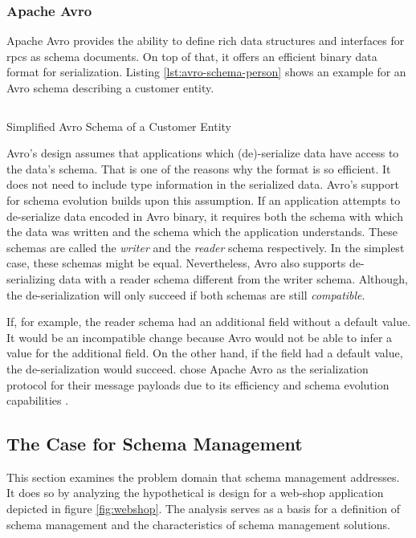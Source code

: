 \subsubsection{Apache Avro}

Apache Avro provides the ability to define rich data structures and interfaces for \glspl{rpc} as schema documents.
On top of that, it offers an efficient binary data format for serialization.
Listing \ref{lst:avro-schema-person} shows an example for an Avro schema describing a customer entity.
\parencite{apache_software_foundation_apache_2021}

\begin{listing}[H]
  \inputminted{json}{assets/src/Customer.avsc}
  \caption{Simplified Avro Schema of a Customer Entity}\label{lst:avro-schema-person}
\end{listing}

Avro's design assumes that applications which (de)-serialize data have access to the data's schema.
That is one of the reasons why the format is so efficient.
It does not need to include type information in the serialized data.
Avro's support for schema evolution builds upon this assumption.
If an application attempts to de-serialize data encoded in Avro binary, it requires both the schema with which the data was written and the schema which the application understands.
These schemas are called the \emph{writer} and the \emph{reader} schema respectively.
In the simplest case, these schemas might be equal.
Nevertheless, Avro also supports de-serializing data with a reader schema different from the writer schema.
Although, the de-serialization will only succeed if both schemas are still \emph{compatible}.
\parencite{apache_software_foundation_apache_2021}

If, for example, the reader schema had an additional field without a default value.
It would be an incompatible change because Avro would not be able to infer a value for the additional field.
On the other hand, if the field had a default value, the de-serialization would succeed.
\citeauthor{kreps_kafka_2011} chose Apache Avro as the serialization protocol for their message payloads due to its efficiency and schema evolution capabilities \parencite{kreps_kafka_2011}. 

\subsection{The Case for Schema Management}

This section examines the problem domain that schema management addresses.
It does so by analyzing the hypothetical \gls{is} design for a web-shop application depicted in figure \ref{fig:webshop}.
The analysis serves as a basis for a definition of schema management and the characteristics of schema management solutions.

